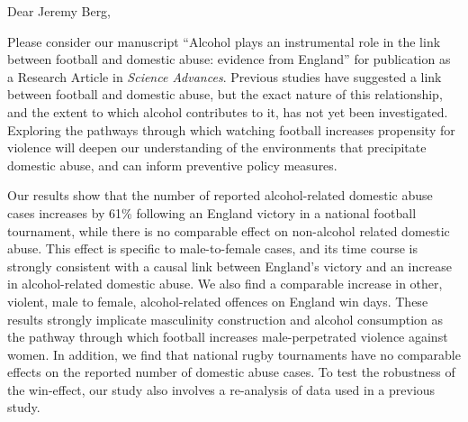 \documentclass{letter}
\begin{document}
\begin{letter}
{}




\opening{Dear Jeremy Berg,} %

Please consider our manuscript ``Alcohol plays an instrumental role in the link between football and domestic abuse: evidence from England'' for publication as a Research Article in \textit{Science Advances}. Previous studies have suggested a link between football and domestic abuse, but the exact nature of this relationship, and the extent to which alcohol contributes to it, has not yet been investigated. Exploring the pathways through which watching football increases propensity for violence will deepen our understanding of the environments that precipitate domestic abuse, and can inform preventive policy measures.


Our results show that the number of reported alcohol-related domestic abuse cases increases by 61\% following an England victory
in a national football tournament, while there is no comparable effect on non-alcohol related domestic abuse. This effect is specific to male-to-female cases, and its time course is strongly consistent with a causal link between England's victory and an increase in alcohol-related domestic abuse. We also find a comparable increase in other, violent, male to female, alcohol-related offences on England win days. These results strongly implicate masculinity construction and alcohol consumption as the pathway through which football increases male-perpetrated violence against women. In addition, we find that national rugby tournaments have no comparable effects on the reported number of domestic abuse cases. To test the robustness of the win-effect, our study also involves a re-analysis of data used in a previous study. 


\end{letter}
\end{document}
